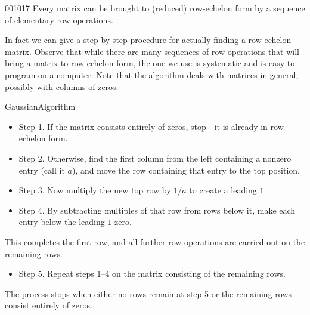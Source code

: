 \begin{theorem}{}{001017}
Every matrix can be brought to (reduced) row-echelon form by a sequence of elementary row operations. 
\end{theorem}

In fact we can give a step-by-step procedure for actually finding a row-echelon matrix. Observe that while there are many sequences of row operations that will bring a matrix to row-echelon form, the one we use is systematic and is easy to program on a computer. Note that the algorithm deals with matrices in general, possibly with columns of zeros. 

\begin{theorem*}[label=thm:001021]{Gaussian\footnotemark Algorithm\footnotemark}

\begin{itemize}
\item[] Step 1. If the matrix consists entirely of zeros, stop---it is already in row-echelon form.

\item[] Step 2. Otherwise, find the first column from the left containing a nonzero entry (call it $a$), and move the row containing that entry to the top position.
\item[] Step 3. Now multiply the new top row by $1/a$ to create a leading $1$.

\item[] Step 4. By subtracting multiples of that row from rows below it, make each entry below the leading $1$ zero.
\end{itemize}

This completes the first row, and all further row operations are carried out on the remaining rows.

\begin{itemize}
\item[] Step 5. Repeat steps 1--4 on the matrix consisting of the remaining rows.
\end{itemize}
The process stops when either no rows remain at step 5 or the remaining rows consist entirely of zeros. 
\end{theorem*}
